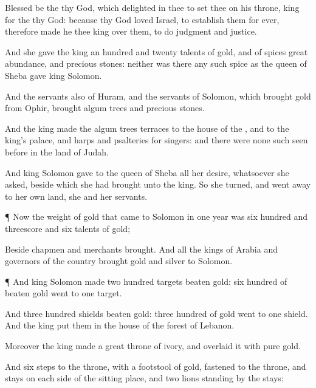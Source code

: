 {Blessed be the
{} thy
God, which
delighted in thee to
set thee on his
throne,
{}
king for the
{} thy
God: because thy
God
loved
Israel, to
establish them for
ever, therefore
made he thee
king over them, to
do
judgment and
justice.

And she
gave the
king an
hundred and
twenty
talents of
gold, and of
spices
great
abundance, and
precious
stones: neither was there any such
spice as the
queen of
Sheba
gave
king
Solomon.

And the
servants also of
Huram, and the
servants of
Solomon, which
brought
gold from
Ophir,
brought
algum
trees and
precious
stones.

And the
king
made
{} the
algum
trees
terraces to the
house of the
{}, and to the
king’s
palace, and
harps and
psalteries for
singers: and there were none
such
seen
before in the
land of
Judah.

And
king
Solomon
gave to the
queen of
Sheba all her
desire, whatsoever she
asked, beside
{} which she had
brought unto the
king. So she
turned, and went
away to her own
land, she and her
servants.


\par }{\PP {}¶ Now the
weight of
gold that
came to
Solomon in
one
year was
six
hundred and
threescore and
six
talents of
gold;

Beside
{}
chapmen and
merchants
brought. And all the
kings of
Arabia and
governors of the
country
brought
gold and
silver to
Solomon.


\par }{\PP {}¶ And
king
Solomon
made two
hundred
targets
{}
beaten
gold:
six
hundred
{} of
beaten
gold
went to
one
target.

And
three
hundred
shields
{}
beaten
gold:
three
hundred
{} of
gold
went to
one
shield. And the
king
put them in the
house of the
forest of
Lebanon.

Moreover the
king
made a
great
throne of
ivory, and
overlaid it with
pure
gold.

And
{}
six
steps to the
throne, with a
footstool of
gold,
{}
fastened to the
throne, and
stays on each side of the
sitting
place, and
two
lions
standing
by the
stays:

}

